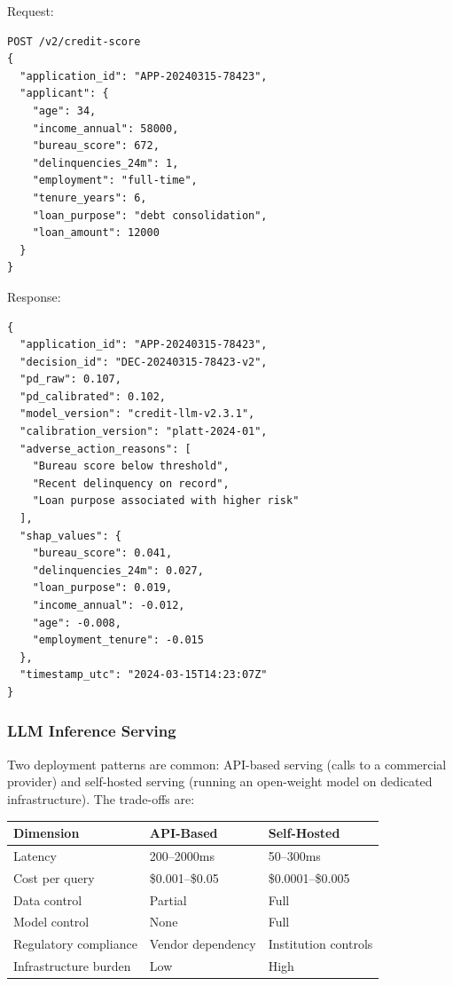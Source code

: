 \begin{context}
\begin{example}
\label{ex:api}
Request:
\begin{verbatim}
POST /v2/credit-score
{
  "application_id": "APP-20240315-78423",
  "applicant": {
    "age": 34,
    "income_annual": 58000,
    "bureau_score": 672,
    "delinquencies_24m": 1,
    "employment": "full-time",
    "tenure_years": 6,
    "loan_purpose": "debt consolidation",
    "loan_amount": 12000
  }
}
\end{verbatim}

Response:
\begin{verbatim}
{
  "application_id": "APP-20240315-78423",
  "decision_id": "DEC-20240315-78423-v2",
  "pd_raw": 0.107,
  "pd_calibrated": 0.102,
  "model_version": "credit-llm-v2.3.1",
  "calibration_version": "platt-2024-01",
  "adverse_action_reasons": [
    "Bureau score below threshold",
    "Recent delinquency on record",
    "Loan purpose associated with higher risk"
  ],
  "shap_values": {
    "bureau_score": 0.041,
    "delinquencies_24m": 0.027,
    "loan_purpose": 0.019,
    "income_annual": -0.012,
    "age": -0.008,
    "employment_tenure": -0.015
  },
  "timestamp_utc": "2024-03-15T14:23:07Z"
}
\end{verbatim}
\end{example}

\subsubsection*{LLM Inference Serving}

Two deployment patterns are common: API-based serving (calls to a commercial provider) and self-hosted serving (running an open-weight model on dedicated infrastructure). The trade-offs are:

\begin{center}
\begin{tabular}{lll}
\toprule
Dimension & API-Based & Self-Hosted \\
\midrule
Latency & 200--2000ms & 50--300ms \\
Cost per query & \$0.001--\$0.05 & \$0.0001--\$0.005 \\
Data control & Partial & Full \\
Model control & None & Full \\
Regulatory compliance & Vendor dependency & Institution controls \\
Infrastructure burden & Low & High \\
\bottomrule
\end{tabular}
\end{center}


\end{context}
